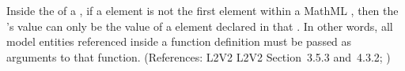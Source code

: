 Inside the  of a \FunctionDefinition, if a
 element is not the first element within a MathML
, then the 's value can only be the value
of a  element declared in that .  In
other words, all model entities referenced inside a function
definition must be passed as arguments to that function.
(References: L2V2
L2V2 Section~3.5.3 and~4.3.2; )
